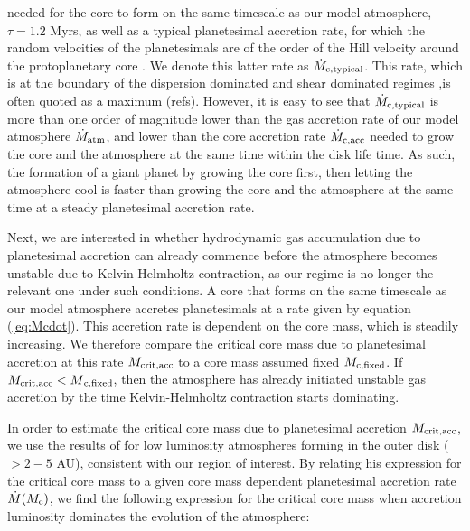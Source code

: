 \documentclass[apj]{emulateapj}
\begin{document}
\noindent needed for the core to form on the same timescale as our model atmosphere, $\tau=1.2$ Myrs, as well as a typical planetesimal accretion rate, for which the random velocities of the planetesimals are of the order of the Hill velocity around the protoplanetary core \citep{goldreich04}. We denote this latter rate as $\dot{M}_{\rm{c,typical}}$. This rate, which is at the boundary of the dispersion dominated and shear dominated regimes ,is often quoted as a maximum (refs). However, it is easy to see that  $\dot{M}_{\rm{c,typical}}$ is more than one order of magnitude lower than the gas accretion rate of our model atmosphere $\dot{M}_{\rm{atm}}$, and lower than the core accretion rate $\dot{M}_{\rm{c,acc}}$ needed to grow the core and the atmosphere at the same time within the disk life time. As such, the formation of a giant planet by growing the core first, then letting the atmosphere cool is faster than growing the core and the atmosphere at the same time at a steady planetesimal accretion rate.

Next, we are interested in whether hydrodynamic gas accumulation due to planetesimal accretion can already commence before the atmosphere becomes unstable due to Kelvin-Helmholtz contraction, as our regime is no longer the relevant one under such conditions. A core that forms on the same timescale as our model atmosphere accretes planetesimals at a rate given by equation (\ref{eq:Mcdot}). This accretion rate is dependent on the core mass, which is steadily increasing. We therefore compare the critical core mass due to planetesimal accretion at this rate $M_{\rm{crit,acc}}$ to a core mass assumed fixed $M_{\rm{c,fixed}}$. If $M_{\rm{crit,acc}}<M{\rm_{c, fixed}}$, then the atmosphere has already initiated unstable gas accretion by the time Kelvin-Helmholtz contraction starts dominating. 



In order to estimate the critical core mass due to planetesimal accretion $M_{\rm{crit,acc}}$, we use the results of \citet{rafikov06} for low luminosity atmospheres forming in the outer disk ($>2-5$ AU), consistent with our region of interest. By relating his expression for the critical core mass to a given core mass dependent planetesimal accretion rate $\dot{M}(M_{\rm{c}})$, we find the following expression for the critical core mass when accretion luminosity dominates the evolution of the atmosphere:
\end{document}
